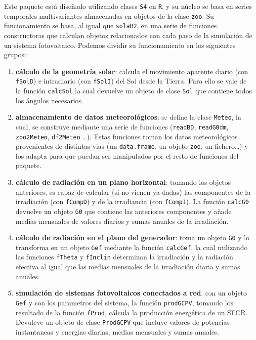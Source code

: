 Este paquete está diseñado utilizando clases \texttt{S4} en \texttt{R}, y su núcleo se basa en series temporales multivariantes almacenadas en objetos de la clase \texttt{zoo}. Su funcionamiento se basa, al igual que \texttt{solaR2}, en una serie de funciones constructoras que calculan objetos relacionados con cada paso de la simulación de un sistema fotovoltaico. Podemos dividir su funcionamiento en los siguientes grupos:
\begin{enumerate}
\item \textbf{cálculo de la geometría solar}: calcula el movimiento aparente diario (con \texttt{fSolD}) e intradiario (con \texttt{fSolI}) del Sol desde la Tierra. Para ello se vale de la función \texttt{calcSol} la cual devuelve un objeto de clase \texttt{Sol} que contiene todos los ángulos necesarios.
\item \textbf{almacenamiento de datos meteorológicos}: se define la clase \texttt{Meteo}, la cual, se construye mediante una serie de funciones (\texttt{readBD}, \texttt{readG0dm}, \texttt{zoo2Meteo}, \texttt{df2Meteo} \ldots{}). Estas funciones toman los datos meteorológicos provenientes de distintas vias (un \texttt{data.frame}, un objeto \texttt{zoo}, un fichero\ldots{}) y los adapta para que puedan ser manipulados por el resto de funciones del paquete.
\item \textbf{cálculo de radiación en un plano horizontal}: tomando los objetos anteriores, es capaz de calcular (si no vienen ya dadas) las componentes de la irradiación (con \texttt{fCompD}) y de la irradiancia (con \texttt{fCompI}). La función \texttt{calcG0} devuelve un objeto \texttt{G0} que contiene las anteriores componentes y añade medias mensuales de valores diarios y sumas anuales de la irradiación.
\item \textbf{cálculo de radiación en el plano del generador}: toma un objeto \texttt{G0} y lo transforma en un objeto \texttt{Gef} mediante la función \texttt{calcGef}, la cual utilizando las funciones \texttt{fTheta} y \texttt{fInclin} determinan la irradiación y la radiación efectiva al igual que las medias mensuales de la irradiación diaria y sumas anuales.
\item \textbf{simulación de sistemas fotovoltaicos conectados a red}: con un objeto \texttt{Gef} y con los parametros del sistema, la función \texttt{prodGCPV}, tomando los resultado de la función \texttt{fProd}, cálcula la producción energética de un SFCR. Devuleve un objeto de clase \texttt{ProdGCPV} que incluye valores de potencias instantaneas y energías diarias, medias mensuales y sumas anuales.

\end{enumerate}
